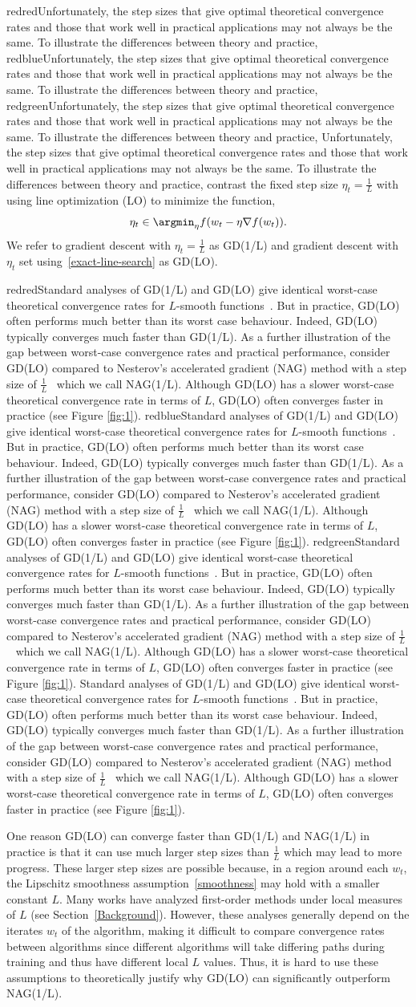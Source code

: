 \documentclass[10pt]{article} %
\newif\ifshowcolours
\def\red{red}
\def\blue{blue}
\def\green{green}
\renewcommand{\textcolor}[2]{%
  \ifshowcolours
    {\color{#1}#2}%
  \else
    \def\temp{#1}%
    \ifx\temp\red     #2\else
    \ifx\temp\blue    #2\else
    \ifx\temp\green   #2\else
        {\color{#1}#2}%
    \fi\fi\fi
  \fi
}
\begin{document}
\textcolor{red}{Unfortunately, the step sizes that give optimal theoretical convergence rates and those that work well in practical applications may not always be the same. To illustrate the differences between theory and practice,} contrast the fixed step size $\eta_t = \frac{1}{L}$ with using line optimization (LO) to minimize the function,
\begin{equation}
    \label{exact-line-search}
    \eta_{t} \in \argmin_{\eta} f(w_{t} - \eta \nabla f(w_{t})).
\end{equation}
We refer to gradient descent with $\eta_t=\frac 1 L$ as GD(1/L) and gradient descent with $\eta_t$ set using~\eqref{exact-line-search} as GD(LO). \textcolor{red}{Standard analyses of GD(1/L) and GD(LO) give identical worst-case theoretical convergence rates for $L$-smooth functions~\cite{KarimiNS16}. But in practice, GD(LO) often performs much better than its worst case behaviour. Indeed, GD(LO) typically
converges much faster than GD(1/L). As a further illustration of the gap between worst-case convergence rates and practical performance, consider GD(LO) compared to Nesterov's accelerated gradient (NAG) method with a step size of $\frac{1}{L}$~\cite{nesterov2018lectures} which we call NAG(1/L). 
Although GD(LO) has a slower worst-case theoretical convergence rate in terms of $L$, GD(LO) often converges faster in practice (see Figure \ref{fig:1}).} 

One reason GD(LO) can converge faster than GD(1/L) and NAG(1/L) in practice is that it can use much larger step sizes than $\frac{1}{L}$ which may lead to more progress. These larger step sizes are possible because, in a region around each $w_t$, the Lipschitz smoothness assumption~\eqref{smoothness} may hold with a smaller constant $L$. Many works have analyzed first-order methods under local measures of $L$ (see Section~\ref{Background}). However, these analyses generally depend on the iterates $w_t$ of the algorithm, making it difficult to compare convergence rates between algorithms since different algorithms will take differing paths during training and thus have different local $L$ values. Thus, it is hard to use these assumptions to theoretically justify why GD(LO) can significantly outperform NAG(1/L).
\end{document}

